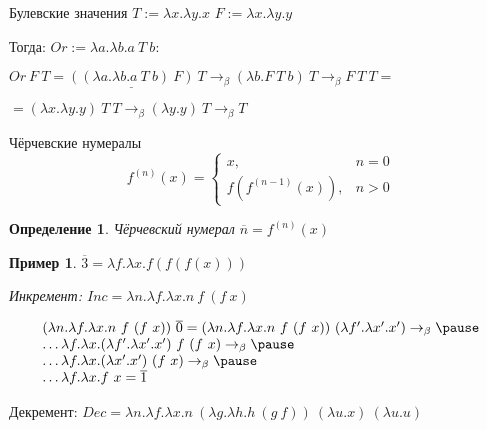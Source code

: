 \documentclass[aspectratio=169]{beamer}
\newtheorem{dfn}{Определение}[section]
\newtheorem{exm}{Пример}[section]
\begin{document}
\begin{frame}{Булевские значения}
$T := \lambda x.\lambda y.x$
$F := \lambda x.\lambda y.y$

Тогда: $Or := \lambda a.\lambda b.a\ T\ b$:

$Or\ F\ T = \underline{((\lambda a.\lambda b.a\ T\ b)\ F)}\ T \rightarrow_\beta (\lambda b.F\ T\ b)\ T
\rightarrow_\beta F\ T\ T =$

$=(\lambda x.\lambda y.y)\ T\ T\rightarrow_\beta (\lambda y.y)\ T \rightarrow_\beta T$
\end{frame}

\begin{frame}{Чёрчевские нумералы}
$$f^{(n)}(x) = \left\{\begin{array}{ll}x, & n = 0\\f(f^{(n-1)}(x)), & n > 0\end{array}\right.$$

\begin{dfn}
Чёрчевский нумерал $\overline{n} = f^{(n)}(x)$
\end{dfn}

\begin{exm}
$\overline{3} = \lambda f.\lambda x.f(f(f(x)))$

Инкремент: $Inc = \lambda n.\lambda f.\lambda x.n\ f\ (f\ x)$
\end{exm}\vspace{-0.3cm}

$$\begin{array}{l}(\lambda n.\lambda f.\lambda x

.n\ f\ (f\ x))\ \overline{0} = (\lambda n.\lambda f.\lambda x.n\ f\ (f\ x))\ (\lambda f'.\lambda x'.x') \rightarrow_\beta \pause\\
  \dots\lambda f.\lambda x.(\lambda f'.\lambda x'.x')\ f\ (f\ x) \rightarrow_\beta \pause\\
  \dots\lambda f.\lambda x.(\lambda x'.x')\ (f\ x) \rightarrow_\beta \pause\\
  \dots\lambda f.\lambda x.f\ x = \overline{1}\end{array}$$
\pause

Декремент: $Dec = \lambda n.\lambda f.\lambda x.n\ (\lambda g.\lambda h.h\ (g\ f))\ (\lambda u.x)\ (\lambda u.u)$
\end{frame}
\end{document}
